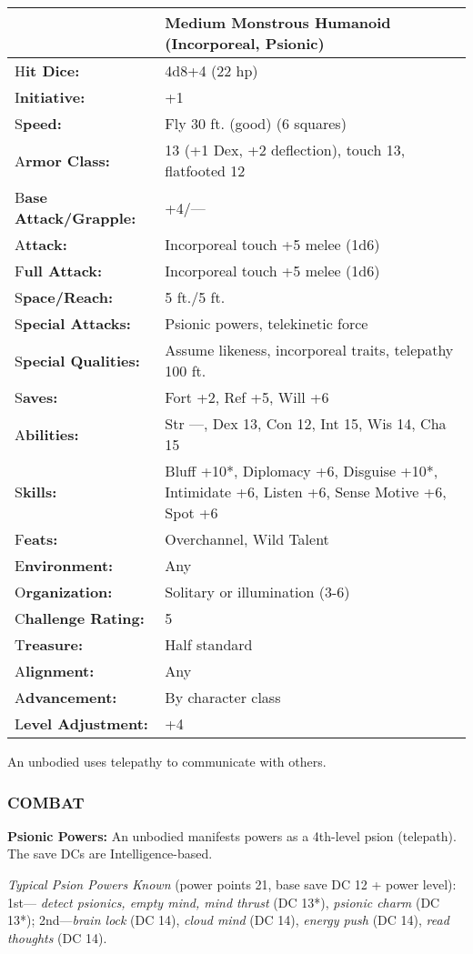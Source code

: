 \documentclass{article}
\begin{document}
\begin{tabular}{|>{\raggedright}p{91pt}|>{\raggedright}p{217pt}|}
\hline
  & Medium Monstrous Humanoid (Incorporeal, Psionic)\tabularnewline
\hline
H\textbf{it Dice:} & 4d8+4 (22 hp)\tabularnewline
\hline
I\textbf{nitiative:} & +1\tabularnewline
\hline
S\textbf{peed:} & Fly 30 ft. (good) (6 squares)\tabularnewline
\hline
A\textbf{rmor Class:} & 13 (+1 Dex, +2 deflection), touch 13, flatfooted 12\tabularnewline
\hline
B\textbf{ase Attack/Grapple:} & +4/---\tabularnewline
\hline
A\textbf{ttack:} & Incorporeal touch +5 melee (1d6)\tabularnewline
\hline
F\textbf{ull Attack:} & Incorporeal touch +5 melee (1d6)\tabularnewline
\hline
S\textbf{pace/Reach:} & 5 ft./5 ft.\tabularnewline
\hline
S\textbf{pecial Attacks:} & Psionic powers, telekinetic force\tabularnewline
\hline
S\textbf{pecial Qualities:} & Assume likeness, incorporeal traits, telepathy 100 
ft.\tabularnewline
\hline
S\textbf{aves:} & Fort +2, Ref +5, Will +6\tabularnewline
\hline
A\textbf{bilities:} & Str ---, Dex 13, Con 12, Int 15, Wis 14, Cha 15\tabularnewline
\hline
S\textbf{kills:} & Bluff +10*, Diplomacy +6, Disguise +10*, Intimidate +6, Listen 
+6, Sense Motive +6, Spot +6\tabularnewline
\hline
F\textbf{eats:} & Overchannel, Wild Talent\tabularnewline
\hline
E\textbf{nvironment:} & Any\tabularnewline
\hline
O\textbf{rganization:} & Solitary or illumination (3-6)\tabularnewline
\hline
C\textbf{hallenge Rating:} & 5\tabularnewline
\hline
T\textbf{reasure:} & Half standard\tabularnewline
\hline
A\textbf{lignment:} & Any\tabularnewline
\hline
A\textbf{dvancement:} & By character class\tabularnewline
\hline
L\textbf{evel Adjustment:} & +4\tabularnewline
\hline
\end{tabular}

An unbodied uses telepathy to communicate with others.

\subsubsection*{COMBAT}

\textbf{Psionic Powers: }An unbodied manifests powers as a 4th-level psion (telepath). 
The save DCs are Intelligence-based. 

\textit{Typical Psion Powers Known }(power points 21, base save DC 12 + power level): 
1st--- \textit{detect psionics, empty mind, mind thrust }(DC 13*), \textit{psionic 
charm }(DC 13*); 2nd---\textit{brain lock }(DC 14), \textit{cloud mind }(DC 14), 
\textit{energy push }(DC 14), \textit{read thoughts }(DC 14).
\end{document}
